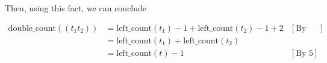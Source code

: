 \documentclass[12pt]{article}
\begin{document}
\begin{enumerate}[a.]
\begin{mdframed}
\begin{enumerate}[1.]
\begin{mdframed}
\begin{enumerate}[1.]
\begin{mdframed}
            \bigskip

            Then, using this fact, we can conclude

            \begin{align}
                \text{double\_count}((t_1t_2)) &= \text{left\_count}(t_1) - 1 + \text{left\_count}(t_2) - 1 + 2 & [\text{By I.H}]\\
                &= \text{left\_count}(t_1) + \text{left\_count}(t_2)\\
                &= \text{left\_count}(t) - 1 & [\text{By 5}]
            \end{align}
            \end{mdframed}

        \end{enumerate}

        \end{mdframed}
    \end{enumerate}
    \end{mdframed}



\end{enumerate}
\end{document}
